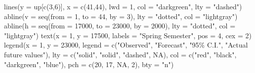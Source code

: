 \documentclass[
]{book}
\newenvironment{Shaded}{\begin{snugshade}}{\end{snugshade}}
\newcommand{\AttributeTok}[1]{\textcolor[rgb]{0.77,0.63,0.00}{#1}}
\newcommand{\ConstantTok}[1]{\textcolor[rgb]{0.00,0.00,0.00}{#1}}
\newcommand{\DecValTok}[1]{\textcolor[rgb]{0.00,0.00,0.81}{#1}}
\newcommand{\FunctionTok}[1]{\textcolor[rgb]{0.00,0.00,0.00}{#1}}
\newcommand{\NormalTok}[1]{#1}
\newcommand{\StringTok}[1]{\textcolor[rgb]{0.31,0.60,0.02}{#1}}
\theoremstyle{definition}
\theoremstyle{definition}
\theoremstyle{definition}
\theoremstyle{definition}
\theoremstyle{remark}
\begin{document}
\begin{Shaded}
\begin{Highlighting}[]
  \FunctionTok{lines}\NormalTok{(}\AttributeTok{y =}\NormalTok{ up[}\FunctionTok{c}\NormalTok{(}\DecValTok{3}\NormalTok{,}\DecValTok{6}\NormalTok{)], }\AttributeTok{x =} \FunctionTok{c}\NormalTok{(}\DecValTok{41}\NormalTok{,}\DecValTok{44}\NormalTok{), }\AttributeTok{lwd =} \DecValTok{1}\NormalTok{, }\AttributeTok{col =} \StringTok{"darkgreen"}\NormalTok{, }\AttributeTok{lty =} \StringTok{"dashed"}\NormalTok{) }
  \FunctionTok{abline}\NormalTok{(}\AttributeTok{v =} \FunctionTok{seq}\NormalTok{(}\AttributeTok{from =} \DecValTok{1}\NormalTok{, }\AttributeTok{to =} \DecValTok{44}\NormalTok{, }\AttributeTok{by =} \DecValTok{3}\NormalTok{), }\AttributeTok{lty =} \StringTok{"dotted"}\NormalTok{, }\AttributeTok{col =} \StringTok{"lightgray"}\NormalTok{)}
  \FunctionTok{abline}\NormalTok{(}\AttributeTok{h =} \FunctionTok{seq}\NormalTok{(}\AttributeTok{from =} \DecValTok{17000}\NormalTok{, }\AttributeTok{to =} \DecValTok{23000}\NormalTok{, }\AttributeTok{by =} \DecValTok{2000}\NormalTok{), }\AttributeTok{lty =} \StringTok{"dotted"}\NormalTok{, }\AttributeTok{col =} \StringTok{"lightgray"}\NormalTok{)}
  \FunctionTok{text}\NormalTok{(}\AttributeTok{x =} \DecValTok{1}\NormalTok{, }\AttributeTok{y =} \DecValTok{17500}\NormalTok{, }\AttributeTok{labels =} \StringTok{"Spring Semester"}\NormalTok{, }\AttributeTok{pos =} \DecValTok{4}\NormalTok{, }\AttributeTok{cex =} \DecValTok{2}\NormalTok{)}
  \FunctionTok{legend}\NormalTok{(}\AttributeTok{x =} \DecValTok{1}\NormalTok{, }\AttributeTok{y =} \DecValTok{23000}\NormalTok{, }\AttributeTok{legend =} \FunctionTok{c}\NormalTok{(}\StringTok{"Observed"}\NormalTok{, }\StringTok{"Forecast"}\NormalTok{, }\StringTok{"95\% C.I."}\NormalTok{, }\StringTok{"Actual future values"}\NormalTok{), }
         \AttributeTok{lty =} \FunctionTok{c}\NormalTok{(}\StringTok{"solid"}\NormalTok{, }\StringTok{"solid"}\NormalTok{, }\StringTok{"dashed"}\NormalTok{, }\ConstantTok{NA}\NormalTok{), }\AttributeTok{col =} \FunctionTok{c}\NormalTok{(}\StringTok{"red"}\NormalTok{, }\StringTok{"black"}\NormalTok{, }\StringTok{"darkgreen"}\NormalTok{, }\StringTok{"blue"}\NormalTok{), }\AttributeTok{pch =} \FunctionTok{c}\NormalTok{(}\DecValTok{20}\NormalTok{, }\DecValTok{17}\NormalTok{, }\ConstantTok{NA}\NormalTok{, }\DecValTok{2}\NormalTok{), }\AttributeTok{bty =} \StringTok{"n"}\NormalTok{)}


  
  

\end{Highlighting}
\end{Shaded}
\end{document}
